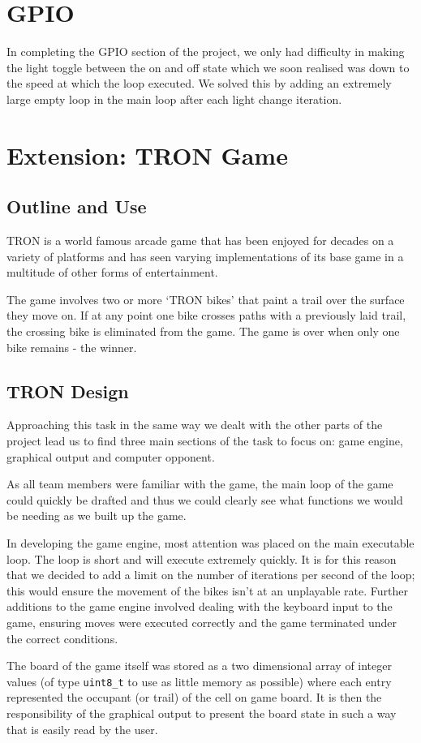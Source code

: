 \documentclass[11pt]{article}
\begin{document}
\section{GPIO}

In completing the GPIO section of the project, we only had difficulty in making the light toggle between the on and off state which we soon realised was down to the speed at which the loop executed. We solved this by adding an extremely large empty loop in the main loop after each light change iteration.



\section{Extension: TRON Game}
\subsection{Outline and Use}
TRON is a world famous arcade game that has been enjoyed for decades on a variety of platforms and has seen varying implementations of its base game in a multitude of other forms of entertainment.\par
The game involves two or more `TRON bikes' that paint a trail over the surface they move on. If at any point one bike crosses paths with a previously laid trail, the crossing bike is eliminated from the game. The game is over when only one bike remains - the winner. \par


\subsection{TRON Design}
Approaching this task in the same way we dealt with the other parts of the project lead us to find three main sections of the task to focus on: game engine, graphical output and computer opponent.\par
As all team members were familiar with the game, the main loop of the game could quickly be drafted and thus we could clearly see what functions we would be needing as we built up the game.\par
In developing the game engine, most attention was placed on the main executable loop. The loop is short and will execute extremely quickly. It is for this reason that we decided to add a limit on the number of iterations per second of the loop; this would ensure the movement of the bikes isn't at an unplayable rate. Further additions to the game engine involved dealing with the keyboard input to the game, ensuring moves were executed correctly and the game terminated under the correct conditions.\par
The board of the game itself was stored as a two dimensional array of integer values (of type \texttt{uint8\_t} to use as little memory as possible) where each entry represented the occupant (or trail) of the cell on game board. It is then the responsibility of the graphical output to present the board state in such a way that is easily read by the user.\par
\end{document}
